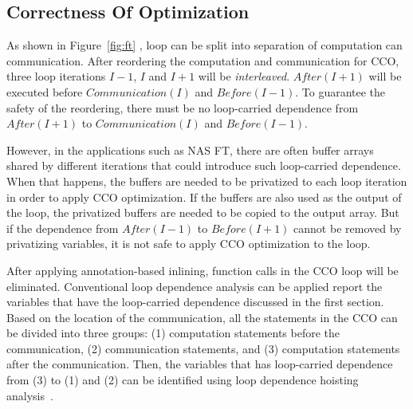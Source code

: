 \subsection{Correctness Of Optimization}
\label{sec:cco:safety}



As shown in Figure~\ref{fig:ft} , loop can be split into separation of
computation can communication.  After reordering the computation and
communication for CCO, three loop iterations $I-1$, $I$ and $I+1$ will
be \emph{interleaved}.  $After(I+1)$ will be executed before
$Communication(I)$ and $Before(I-1)$.  To guarantee the safety of the
reordering, there must be no loop-carried dependence from $After(I+1)$
to $Communication(I)$ and $Before(I-1)$.

However, in the applications such as NAS FT, there are often buffer
arrays shared by different iterations that could introduce such
loop-carried dependence.  When that happens, the buffers are needed to
be privatized to each loop iteration in order to apply CCO
optimization.  If the buffers are also used as the output of the loop,
the privatized buffers are needed to be copied to the output array.
But if the dependence from $After(I-1)$ to $Before(I+1)$ cannot be
removed by privatizing variables, it is not safe to apply CCO
optimization to the loop.

After applying annotation-based inlining, function calls in the CCO
loop will be eliminated.  Conventional loop dependence analysis can be
applied report the variables that have the loop-carried dependence
discussed in the first section.  Based on the location of the
communication, all the statements in the CCO can be divided into three
groups: (1) computation statements before the communication, (2)
communication statements, and (3) computation statements after the
communication.  Then, the variables that has loop-carried dependence
from (3) to (1) and (2) can be identified using loop dependence
hoisting analysis~\cite{YKA:JSC04}.
